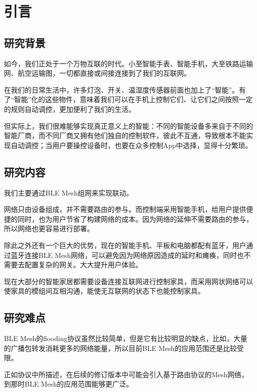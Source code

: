 \chapter{引言}

\section{研究背景}
如今，我们正处于一个万物互联的时代。小至智能手表、智能手机，大至铁路运输网、航空运输图，一切都直接或间接连接到了我们的互联网。

在我们的日常生活中，许多灯泡、开关、温湿度传感器前面也加上了“智能”。有了“智能”化的这些物件，意味着我们可以在手机上控制它们、让它们之间按照一定的规则自动调控，更加便利了我们的生活。

但实际上，我们很难能够实现真正意义上的智能：不同的智能设备多来自于不同的智能厂商，而不同厂商又拥有他们独自的控制软件，彼此不互通，导致根本不能实现自动调控；当用户要操控设备时，也要在众多控制App中选择，显得十分繁琐。

\section{研究内容}
我们主要通过BLE Mesh组网来实现联动。

网络只由设备组成，并不需要路由的参与。而控制端采用智能手机，给用户提供便捷的同时，也为用户节省了构建网络的成本。因为网络的延伸不需要路由的参与，所以网络也更容易进行部署。

除此之外还有一个巨大的优势，现在的智能手机、平板和电脑都配有蓝牙，用户通过蓝牙连接BLE Mesh网络，可以避免因为网络原因造成的延时和瘫痪，同时也不需要去配置复杂的网关。大大提升用户体验。\cite{bleinfo}

现在大部分的智能家居都需要设备连接互联网进行控制家具，而采用网状网络可以使家具的模组间互相沟通，能使无互联网的状态下也能控制家具。

\section{研究难点}
BLE Mesh的flooding协议虽然比较简单，但是它有比较明显的缺点，比如，大量的广播包转发消耗更多的网络能量，所以目前BLE Mesh的应用范围还是比较受限。

正如协议中所描述，在后续的修订版本中可能会引入基于路由协议的Mesh网络，到那时BLE Mesh的应用范围能够更广泛。\cite{flooding}